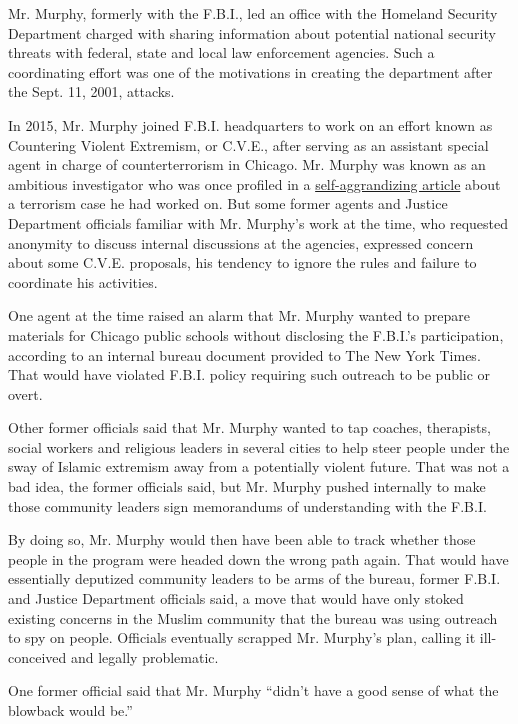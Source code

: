 Mr. Murphy, formerly with the F.B.I., led an office with the Homeland
Security Department charged with sharing information about potential
national security threats with federal, state and local law enforcement
agencies. Such a coordinating effort was one of the motivations in
creating the department after the Sept. 11, 2001, attacks.

In 2015, Mr. Murphy joined F.B.I. headquarters to work on an effort
known as Countering Violent Extremism, or C.V.E., after serving as an
assistant special agent in charge of counterterrorism in Chicago. Mr.
Murphy was known as an ambitious investigator who was once profiled in a
\href{https://www.esquire.com/news-politics/a2184/esq0307murphy/}{self-aggrandizing
article} about a terrorism case he had worked on. But some former agents
and Justice Department officials familiar with Mr. Murphy's work at the
time, who requested anonymity to discuss internal discussions at the
agencies, expressed concern about some C.V.E. proposals, his tendency to
ignore the rules and failure to coordinate his activities.

One agent at the time raised an alarm that Mr. Murphy wanted to prepare
materials for Chicago public schools without disclosing the F.B.I.'s
participation, according to an internal bureau document provided to The
New York Times. That would have violated F.B.I. policy requiring such
outreach to be public or overt.

Other former officials said that Mr. Murphy wanted to tap coaches,
therapists, social workers and religious leaders in several cities to
help steer people under the sway of Islamic extremism away from a
potentially violent future. That was not a bad idea, the former
officials said, but Mr. Murphy pushed internally to make those community
leaders sign memorandums of understanding with the F.B.I.

By doing so, Mr. Murphy would then have been able to track whether those
people in the program were headed down the wrong path again. That would
have essentially deputized community leaders to be arms of the bureau,
former F.B.I. and Justice Department officials said, a move that would
have only stoked existing concerns in the Muslim community that the
bureau was using outreach to spy on people. Officials eventually
scrapped Mr. Murphy's plan, calling it ill-conceived and legally
problematic.

One former official said that Mr. Murphy ``didn't have a good sense of
what the blowback would be.''

